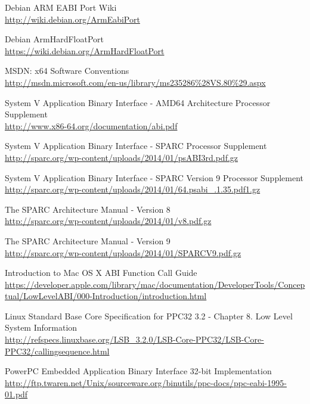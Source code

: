 \begin{thebibliography}{99}
	Debian ARM EABI Port Wiki\\
	\url{http://wiki.debian.org/ArmEabiPort}

	Debian ArmHardFloatPort\\
	\url{https://wiki.debian.org/ArmHardFloatPort}

	MSDN: x64 Software Conventions\\
	\url{http://msdn.microsoft.com/en-us/library/ms235286\%28VS.80\%29.aspx}

	System V Application Binary Interface - AMD64 Architecture Processor Supplement\\
	\url{http://www.x86-64.org/documentation/abi.pdf}

	System V Application Binary Interface - SPARC Processor Supplement\\
	\url{http://sparc.org/wp-content/uploads/2014/01/psABI3rd.pdf.gz}

	System V Application Binary Interface - SPARC Version 9 Processor Supplement\\
	\url{http://sparc.org/wp-content/uploads/2014/01/64.psabi\_.1.35.pdf1.gz}

	The SPARC Architecture Manual - Version 8\\
	\url{http://sparc.org/wp-content/uploads/2014/01/v8.pdf.gz}

	The SPARC Architecture Manual - Version 9\\
	\url{http://sparc.org/wp-content/uploads/2014/01/SPARCV9.pdf.gz}


	Introduction to Mac OS X ABI Function Call Guide\\
	\url{https://developer.apple.com/library/mac/documentation/DeveloperTools/Conceptual/LowLevelABI/000-Introduction/introduction.html}

	Linux Standard Base Core Specification for PPC32 3.2 - Chapter 8. Low Level System Information\\
	\url{http://refspecs.linuxbase.org/LSB\_3.2.0/LSB-Core-PPC32/LSB-Core-PPC32/callingsequence.html}

	PowerPC Embedded Application Binary Interface 32-bit Implementation\\
	\url{http://ftp.twaren.net/Unix/sourceware.org/binutils/ppc-docs/ppc-eabi-1995-01.pdf}


\end{thebibliography}

